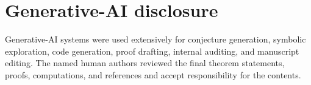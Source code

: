 \documentclass[11pt]{article}
\theoremstyle{definition}
\begin{document}
\section*{Generative-AI disclosure}

Generative-AI systems were used extensively for conjecture generation,
symbolic exploration, code generation, proof drafting, internal auditing, and
manuscript editing.  The named human authors reviewed the final theorem
statements, proofs, computations, and references and accept responsibility for
the contents.



\end{document}
